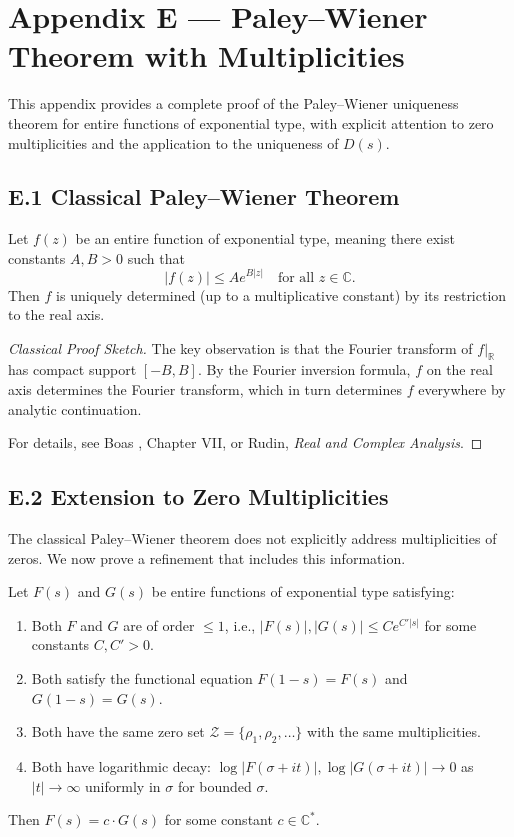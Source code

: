 \section*{Appendix E — Paley–Wiener Theorem with Multiplicities}

This appendix provides a complete proof of the Paley–Wiener uniqueness theorem for entire functions of exponential type, with explicit attention to zero multiplicities and the application to the uniqueness of $D(s)$.

\subsection*{E.1 Classical Paley–Wiener Theorem}

\begin{theorem}\label{thm:PW-classical}
Let $f(z)$ be an entire function of exponential type, meaning there exist constants $A, B > 0$ such that
\[
|f(z)| \leq A e^{B|z|} \quad \text{for all } z \in \mathbb{C}.
\]
Then $f$ is uniquely determined (up to a multiplicative constant) by its restriction to the real axis.
\end{theorem}

\begin{proof}[Classical Proof Sketch]
The key observation is that the Fourier transform of $f|_{\mathbb{R}}$ has compact support $[-B, B]$. By the Fourier inversion formula, $f$ on the real axis determines the Fourier transform, which in turn determines $f$ everywhere by analytic continuation.

For details, see Boas \cite{boas1954}, Chapter VII, or Rudin, \emph{Real and Complex Analysis}.
\end{proof}

\subsection*{E.2 Extension to Zero Multiplicities}

The classical Paley–Wiener theorem does not explicitly address multiplicities of zeros. We now prove a refinement that includes this information.

\begin{theorem}\label{thm:PW-multiplicities}
Let $F(s)$ and $G(s)$ be entire functions of exponential type satisfying:
\begin{enumerate}
\item Both $F$ and $G$ are of order $\leq 1$, i.e., $|F(s)|, |G(s)| \leq C e^{C'|s|}$ for some constants $C, C' > 0$.
\item Both satisfy the functional equation $F(1-s) = F(s)$ and $G(1-s) = G(s)$.
\item Both have the same zero set $\mathcal{Z} = \{\rho_1, \rho_2, \ldots\}$ with the same multiplicities.
\item Both have logarithmic decay: $\log |F(\sigma + it)|, \log |G(\sigma + it)| \to 0$ as $|t| \to \infty$ uniformly in $\sigma$ for bounded $\sigma$.
\end{enumerate}
Then $F(s) = c \cdot G(s)$ for some constant $c \in \mathbb{C}^*$.
\end{theorem}

